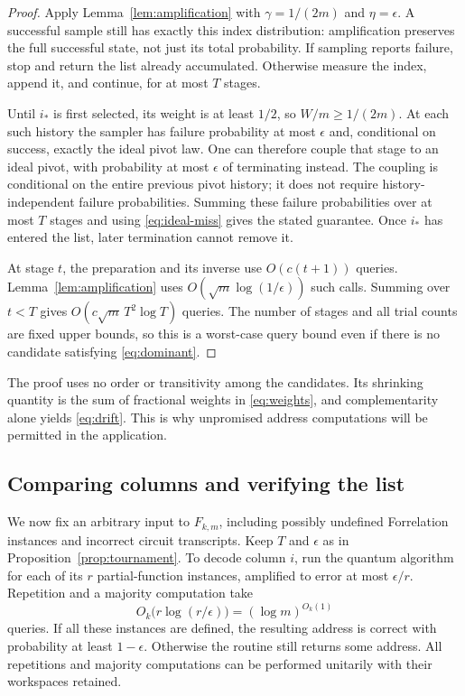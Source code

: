 \documentclass[11pt]{article}
\theoremstyle{definition}
\begin{document}
\begin{proof}
Apply Lemma~\ref{lem:amplification} with $\gamma=1/(2m)$ and
$\eta=\epsilon$. A successful sample still has exactly this index
distribution: amplification preserves the full successful state, not
just its total probability. If sampling reports failure, stop and
return the list already accumulated. Otherwise measure the index,
append it, and continue, for at most $T$ stages.

Until $i_\ast$ is first selected, its weight is at least $1/2$, so
$W/m\ge1/(2m)$. At each such history the sampler has failure probability
at most $\epsilon$ and, conditional on success, exactly the ideal pivot
law. One can therefore couple that stage to an ideal pivot, with
probability at most $\epsilon$ of terminating instead. The coupling
is conditional on the entire previous pivot history; it does not
require history-independent failure probabilities. Summing these
failure probabilities over at most $T$ stages and using
\eqref{eq:ideal-miss} gives the stated guarantee. Once $i_\ast$ has
entered the list, later termination cannot remove it.

At stage $t$, the preparation and its inverse use $O(c(t+1))$ queries.
Lemma~\ref{lem:amplification} uses $O(\sqrt m\log(1/\epsilon))$
such calls. Summing over $t<T$ gives
$O(c\sqrt m\,T^2\log T)$ queries. The number of stages and all trial
counts are fixed upper bounds, so this is a worst-case query bound
even if there is no candidate satisfying \eqref{eq:dominant}.
\end{proof}

The proof uses no order or transitivity among the candidates. Its
shrinking quantity is the sum of fractional weights in
\eqref{eq:weights}, and complementarity alone yields
\eqref{eq:drift}. This is why unpromised address computations will be
permitted in the application.

\subsection{Comparing columns and verifying the list}

We now fix an arbitrary input to $F_{k,m}$, including possibly undefined
Forrelation instances and incorrect circuit transcripts. Keep $T$ and
$\epsilon$ as in Proposition~\ref{prop:tournament}. To decode column
$i$, run the quantum algorithm for each of its $r$ partial-function
instances, amplified to error at most $\epsilon/r$. Repetition and a
majority computation take
\[
 O_k\bigl(r\log(r/\epsilon)\bigr)=(\log m)^{O_k(1)}
\]
queries. If all these instances are defined, the resulting address is
correct with probability at least $1-\epsilon$. Otherwise the routine
still returns some address. All repetitions and majority computations
can be performed unitarily with their workspaces retained.
\end{document}
